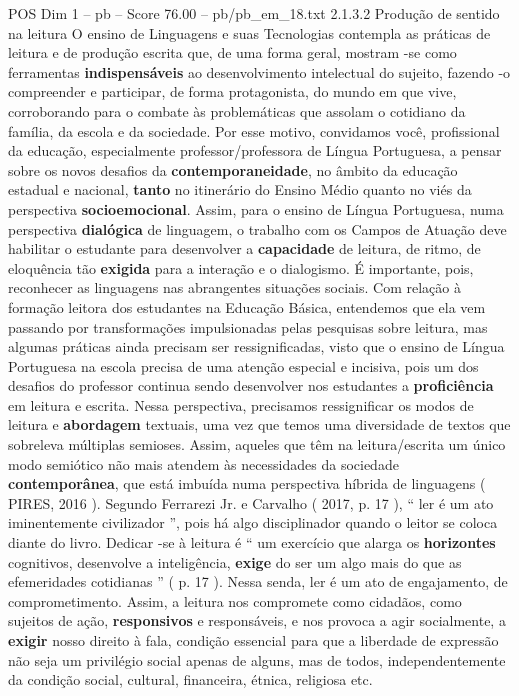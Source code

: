 \begin{textsample}{POS Dim 1 – pb – Score 76.00 – pb/pb\_em\_18.txt}  \label{ex:f1_pos_141}
2.1.3.2 Produção de sentido na leitura O ensino de Linguagens e suas Tecnologias contempla as práticas de leitura e de produção escrita que, de uma forma geral, mostram -se como ferramentas \textbf{indispensáveis} ao desenvolvimento intelectual do sujeito, fazendo -o compreender e participar, de forma protagonista, do mundo em que vive, corroborando para o combate às problemáticas que assolam o cotidiano da família, da escola e da sociedade.
Por esse motivo, convidamos você, profissional da educação, especialmente professor/professora de Língua Portuguesa, a pensar sobre os novos desafios da \textbf{contemporaneidade}, no âmbito da educação estadual e nacional, \textbf{tanto} no itinerário do Ensino Médio quanto no viés da perspectiva \textbf{socioemocional}.
Assim, para o ensino de Língua Portuguesa, numa perspectiva \textbf{dialógica} de linguagem, o trabalho com os Campos de Atuação deve habilitar o estudante para desenvolver a \textbf{capacidade} de leitura, de ritmo, de eloquência tão \textbf{exigida} para a interação e o dialogismo.
É importante, pois, reconhecer as linguagens nas abrangentes situações sociais.
Com relação à formação leitora dos estudantes na Educação Básica, entendemos que ela vem passando por transformações impulsionadas pelas pesquisas sobre leitura, mas algumas práticas ainda precisam ser ressignificadas, visto que o ensino de Língua Portuguesa na escola precisa de uma atenção especial e incisiva, pois um dos desafios do professor continua sendo desenvolver nos estudantes a \textbf{proficiência} em leitura e escrita.
Nessa perspectiva, precisamos ressignificar os modos de leitura e \textbf{abordagem} textuais, uma vez que temos uma diversidade de textos que sobreleva múltiplas semioses.
Assim, aqueles que têm na leitura/escrita um único modo semiótico não mais atendem às necessidades da sociedade \textbf{contemporânea}, que está imbuída numa perspectiva híbrida de linguagens ( PIRES, 2016 ).
Segundo Ferrarezi Jr. e Carvalho ( 2017, p. 17 ), “ ler é um ato iminentemente civilizador ”, pois há algo disciplinador quando o leitor se coloca diante do livro.
Dedicar -se à leitura é “ um exercício que alarga os \textbf{horizontes} cognitivos, desenvolve a inteligência, \textbf{exige} do ser um algo mais do que as efemeridades cotidianas ” ( p. 17 ).
Nessa senda, ler é um ato de engajamento, de comprometimento.
Assim, a leitura nos compromete como cidadãos, como sujeitos de ação, \textbf{responsivos} e responsáveis, e nos provoca a agir socialmente, a \textbf{exigir} nosso direito à fala, condição essencial para que a liberdade de expressão não seja um privilégio social apenas de alguns, mas de todos, independentemente da condição social, cultural, financeira, étnica, religiosa etc.

\end{textsample}
